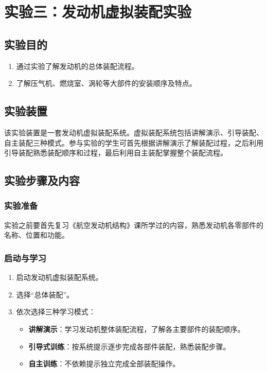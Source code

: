 \section{实验三：发动机虚拟装配实验}

\subsection{实验目的}

\begin{enumerate}
    \item 通过实验了解发动机的总体装配流程。
    \item 了解压气机、燃烧室、涡轮等大部件的安装顺序及特点。
\end{enumerate}

\subsection{实验装置}

该实验装置是一套发动机虚拟装配系统。虚拟装配系统包括讲解演示、引导装配、自主装配三种模式。参与实验的学生可首先根据讲解演示了解装配过程，之后利用引导装配熟悉装配顺序和过程，最后利用自主装配掌握整个装配流程。

\subsection{实验步骤及内容}

\subsubsection{实验准备}

实验之前要首先复习《航空发动机结构》课所学过的内容，熟悉发动机各零部件的名称、位置和功能。

\subsubsection{启动与学习}

\begin{enumerate}
    \item 启动发动机虚拟装配系统。
    \item 选择``总体装配''。
    \item 依次选择三种学习模式：
    \begin{itemize}
        \item \textbf{讲解演示}：学习发动机整体装配流程，了解各主要部件的装配顺序。
        \item \textbf{引导式训练}：按系统提示逐步完成各部件装配，熟悉装配步骤。
        \item \textbf{自主训练}：不依赖提示独立完成全部装配操作。
    \end{itemize}
\end{enumerate}

